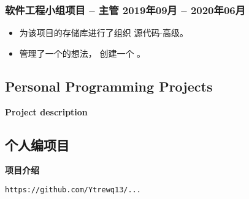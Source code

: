\begin{xcn}
        \subsubsection{软件工程小组项目 -- 主管
        \hfill 2019年09月 -- 2020年06月}
            \begin{itemize}
                \item 为该项目的存储库进行了组织
                    源代码-高级。
                \item 管理了一个的想法，
                    创建一个 。
            \end{itemize}
\end{xcn}
\begin{xen}
    \subsection{Personal Programming Projects}
        \hspace{1em} \textbf{Project description}
\end{xen}
\begin{xcn}
    \subsection{个人编项目} %
        \hspace{1em} \textbf{项目介绍} %
\end{xcn}
        \hfill
        \texttt{https://github.com/Ytrewq13/...}
